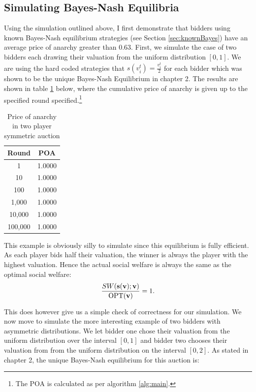 \documentclass[12pt,twoside]{reedthesis}
\begin{document}
\subsection{Simulating Bayes-Nash Equilibria}
Using the simulation outlined above, I first demonstrate that bidders using known Bayes-Nash equilibrium strategies (see Section \ref{sec:knownBayes}) have an average price of anarchy greater than $0.63$. First, we simulate the case of two bidders each drawing their valuation from the uniform distribution $[0,1]$. We are using the hard coded strategies that $s(v^t_i) = \frac{v^t_i}{2}$ for each bidder which was shown to be the unique Bayes-Nash Equilibrium in chapter 2. The results are shown in table \ref{table:1} below, where the cumulative price of anarchy is given up to the specified round specified.\footnote{The POA is calculated as per algorithm \ref{alg:main}. %
}

\begin{table}[h!]
\begin{center}
\begin{tabular}{ |c|c| }
	\hline
	Round & POA \\
	\hline
	1 & 1.0000 \\
	10 & 1.0000 \\
	100 & 1.0000 \\
	1,000 & 1.0000 \\
	10,000 & 1.0000 \\
	100,000 & 1.0000 \\
	\hline
\end{tabular}
\caption{Price of anarchy in two player symmetric auction}
\label{table:1}
\end{center} 
\end{table}

This example is obviously silly to simulate since this equilibrium is fully efficient. As each player bids half their valuation, the winner is always the player with the highest valuation. Hence the actual social welfare is always the same as the optimal social welfare: $$\frac{SW(\textbf{s}(\textbf{v}); \textbf{v})}{\text{OPT}(\textbf{v})} = 1.$$

This does however give us a simple check of correctness for our simulation. We now move to simulate the more interesting example of two bidders with asymmetric distributions. We let bidder one chose their valuation from the uniform distribution over the interval $[0,1]$ and bidder two chooses their valuation from from the uniform distribution on the interval $[0,2]$. As stated in chapter 2, the unique Bayes-Nash equilibrium for this auction is:
\end{document}
